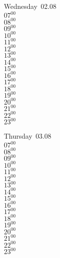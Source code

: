 \documentclass[11pt, a4paper]{book}\usepackage[]{graphicx}\usepackage[]{color}
\begin{document}
\begin{weekdaybox}
  Wednesday~02.08\\
  { 
  \vfill
  $07^{00}$\\
$08^{00}$\\
$09^{00}$\\
$10^{00}$\\
$11^{00}$\\
$12^{00}$\\
$13^{00}$\\
$14^{00}$\\
$15^{00}$\\
$16^{00}$\\
$17^{00}$\\
$18^{00}$\\
$19^{00}$\\
$20^{00}$\\
$21^{00}$\\
$22^{00}$\\
$23^{00}$\\
  }
\end{weekdaybox}
\clearpage
\begin{headerbox}
\end{headerbox}
\begin{weekdaybox}
  Thursday~03.08\\
  { 
  \vfill
  $07^{00}$\\
$08^{00}$\\
$09^{00}$\\
$10^{00}$\\
$11^{00}$\\
$12^{00}$\\
$13^{00}$\\
$14^{00}$\\
$15^{00}$\\
$16^{00}$\\
$17^{00}$\\
$18^{00}$\\
$19^{00}$\\
$20^{00}$\\
$21^{00}$\\
$22^{00}$\\
$23^{00}$\\
  }
\end{weekdaybox} 
\end{document}

